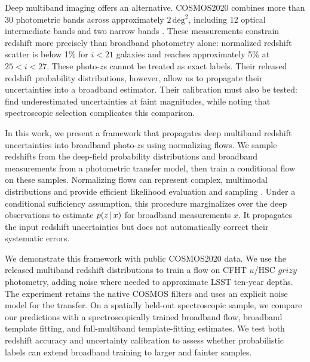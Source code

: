 Deep multiband imaging offers an alternative. COSMOS2020 combines more than
30 photometric bands across approximately $2\,\mathrm{deg}^2$, including
12 optical intermediate bands and two narrow bands \citep{weaver2022}.
These measurements constrain redshift more precisely than broadband photometry
alone: normalized redshift scatter is below 1\% for $i<21$ galaxies and
reaches approximately 5\% at $25<i<27$. These photo-$z$s cannot be treated
as exact labels. Their released redshift probability distributions, however,
allow us to propagate their uncertainties into a broadband estimator.
Their calibration must also be tested: \citet{weaver2022} find underestimated
uncertainties at faint magnitudes, while noting that spectroscopic selection
complicates this comparison.

In this work, we present a framework that propagates deep multiband redshift
uncertainties into broadband photo-$z$s using normalizing flows. We sample
redshifts from the deep-field probability distributions and broadband
measurements from a photometric transfer model, then train a conditional flow
on these samples. Normalizing flows can represent complex, multimodal
distributions and provide efficient likelihood evaluation and sampling
\citep{durkan2019,papamakarios2021}. Under a conditional sufficiency assumption,
this procedure marginalizes over the deep observations to estimate
$p(z\,|\, x)$ for broadband measurements $x$. It propagates the input
redshift uncertainties but does not automatically correct their systematic
errors.

We demonstrate this framework with public COSMOS2020 data. We use the released
multiband redshift distributions to train a flow on CFHT $u$/HSC $grizy$
photometry, adding noise where needed to approximate LSST ten-year depths.
The experiment retains the native COSMOS filters and uses an explicit noise
model for the transfer. On a spatially held-out spectroscopic sample, we
compare our predictions with a spectroscopically trained broadband flow,
broadband template fitting, and full-multiband template-fitting estimates.
We test both redshift accuracy and uncertainty calibration to assess whether
probabilistic labels can extend broadband training to larger and fainter
samples.
